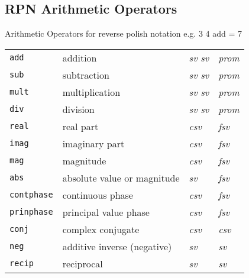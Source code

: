\subsection{RPN Arithmetic Operators}
Arithmetic Operators for reverse polish notation
e.g. 3 4 add = 7

\begin{tabular}{p{.8in}p{2.5in}p{1.0in}p{.75in}}
{\tt add} & addition & {\it sv \newline sv} & {\it prom} \\
{\tt sub} & subtraction & {\it sv \newline sv} & {\it prom} \\
{\tt mult} & multiplication & {\it sv \newline sv} & {\it prom} \\
{\tt div} & division & {\it sv \newline sv} & {\it prom} \\
{\tt real} & real part & {\it csv} & {\it fsv} \\
{\tt imag} & imaginary part & {\it csv} & {\it fsv} \\
{\tt mag} & magnitude & {\it csv} & {\it fsv} \\
{\tt abs} & absolute value or magnitude & {\it sv} & {\it fsv} \\
{\tt contphase} & continuous phase & {\it csv} & {\it fsv} \\
{\tt prinphase} & principal value phase & {\it csv} & {\it fsv} \\
{\tt conj} & complex conjugate & {\it csv} & {\it csv} \\
{\tt neg} & additive inverse (negative) & {\it sv} & {\it sv} \\
{\tt recip} & reciprocal & {\it sv} & {\it sv}
\end{tabular}

%

